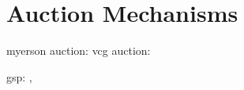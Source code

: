 \documentclass[../main.tex]{subfiles}
\begin{document}
	\chapter{Auction Mechanisms}
	
	
 	myerson auction:\cite{myerson1981optimal}	\cite{Nisan2007-gr} 
 	vcg auction: \cite{varian2014vcg}
	
	gsp: \cite{edelman2007internet}, \cite{varian2007position}
\end{document}
